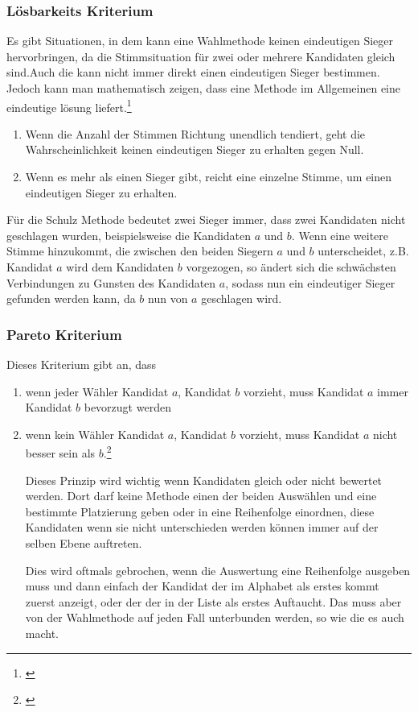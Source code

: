 \subsubsection{Lösbarkeits Kriterium} 
\label{sec:loesbarkeitsKriterium}
Es gibt Situationen, in dem kann eine Wahlmethode keinen eindeutigen Sieger hervorbringen, da die Stimmsituation für zwei oder mehrere Kandidaten gleich sind.Auch die \schulze kann nicht immer direkt einen eindeutigen Sieger bestimmen. Jedoch kann man mathematisch zeigen, dass eine Methode im Allgemeinen eine eindeutige lösung liefert.\footnote{\Vgl \citet{Schulze2017}}
\begin{enumerate}
\item Wenn die Anzahl der Stimmen Richtung unendlich tendiert, geht die Wahrscheinlichkeit keinen eindeutigen Sieger zu erhalten gegen Null.
\item Wenn es mehr als einen Sieger gibt, reicht eine einzelne Stimme, um einen eindeutigen Sieger zu erhalten.
\end{enumerate}

Für die Schulz Methode bedeutet zwei Sieger immer, dass zwei Kandidaten nicht geschlagen wurden, beispielsweise die Kandidaten $a$ und $b$. Wenn eine weitere Stimme hinzukommt, die zwischen den beiden Siegern $a$ und $b$ unterscheidet, z.B. Kandidat $a$ wird dem Kandidaten $b$ vorgezogen, so ändert sich die schwächsten Verbindungen zu Gunsten des Kandidaten $a$, sodass nun ein eindeutiger Sieger gefunden werden kann, da $b$ nun von $a$ geschlagen wird.


\subsubsection{Pareto Kriterium} 
\label{sec:paretoKriterium}
Dieses Kriterium gibt an, dass
\begin{enumerate}
\item wenn jeder Wähler Kandidat $a$, Kandidat $b$ vorzieht, muss Kandidat $a$ immer Kandidat $b$ bevorzugt werden
\item wenn kein Wähler Kandidat $a$, Kandidat $b$ vorzieht, muss Kandidat $a$ nicht besser sein als $b$.\footnote{\Vgl \citet{Schulze2017}}

Dieses Prinzip wird wichtig wenn Kandidaten gleich oder nicht bewertet werden. Dort darf keine Methode einen der beiden Auswählen und eine bestimmte Platzierung geben oder in eine Reihenfolge einordnen, diese Kandidaten wenn sie nicht unterschieden werden können immer auf der selben Ebene auftreten. 

Dies wird oftmals gebrochen, wenn die Auswertung eine Reihenfolge ausgeben muss und dann einfach der Kandidat der im Alphabet als erstes kommt zuerst anzeigt, oder der der in der Liste als erstes Auftaucht. Das muss aber von der Wahlmethode auf jeden Fall unterbunden werden, so wie die \schulze es auch macht. 
\end{enumerate}

